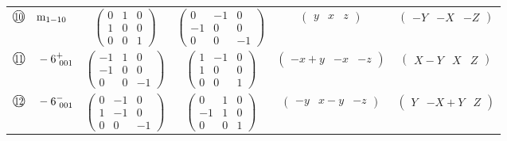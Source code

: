 \documentclass[fleqn,10pt,landscape]{jsarticle}
\begin{document}
\begin{center}
\begin{longtable}{lcccc}
$ {\ooalign{\hfil\resizebox{.8\width}{\height}{10}\hfil\crcr\raise.1ex\hbox{\large$\bigcirc$}}}\quad {\rm m}_{1-10} $ & $ \begin{pmatrix} 0 & 1 & 0 \\ 1 & 0 & 0 \\ 0 & 0 & 1 \end{pmatrix} $ & $ \begin{pmatrix} 0 & -1 & 0 \\ -1 & 0 & 0 \\ 0 & 0 & -1 \end{pmatrix} $ & $ \begin{pmatrix} y & x & z \end{pmatrix} $ & $ \begin{pmatrix} - Y & - X & - Z \end{pmatrix} $ \\
$ {\ooalign{\hfil\resizebox{.8\width}{\height}{11}\hfil\crcr\raise.1ex\hbox{\large$\bigcirc$}}}\quad -6^{+}_{\,\,001} $ & $ \begin{pmatrix} -1 & 1 & 0 \\ -1 & 0 & 0 \\ 0 & 0 & -1 \end{pmatrix} $ & $ \begin{pmatrix} 1 & -1 & 0 \\ 1 & 0 & 0 \\ 0 & 0 & 1 \end{pmatrix} $ & $ \begin{pmatrix} - x + y & - x & - z \end{pmatrix} $ & $ \begin{pmatrix} X - Y & X & Z \end{pmatrix} $ \\
$ {\ooalign{\hfil\resizebox{.8\width}{\height}{12}\hfil\crcr\raise.1ex\hbox{\large$\bigcirc$}}}\quad -6^{-}_{\,\,001} $ & $ \begin{pmatrix} 0 & -1 & 0 \\ 1 & -1 & 0 \\ 0 & 0 & -1 \end{pmatrix} $ & $ \begin{pmatrix} 0 & 1 & 0 \\ -1 & 1 & 0 \\ 0 & 0 & 1 \end{pmatrix} $ & $ \begin{pmatrix} - y & x - y & - z \end{pmatrix} $ & $ \begin{pmatrix} Y & - X + Y & Z \end{pmatrix} $ \\
\end{longtable}
\end{center}
\end{document}

